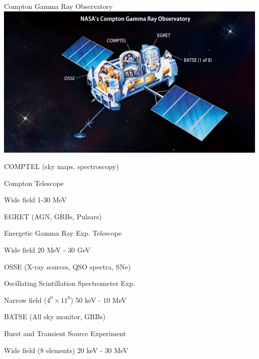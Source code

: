 \vspace*{1cm}
\begin{center}
{\blue Compton Gamma Ray Observatory}\\[5mm]
\includegraphics[keepaspectratio,width=13.5cm]{cgro2}
\end{center}

\newpage
\vspace*{2mm}
%
\begin{itemize}
\item COMPTEL (sky maps, spectroscopy)
\item[] Compton Telescope
\item[] Wide field 1-30 MeV
{\blue
\item EGRET (AGN, GRBs, Pulsars)
\item[] Energetic Gamma Ray Exp. Telescope
\item[] Wide field 20 MeV - 30 GeV
}
\item OSSE (X-ray sources, QSO spectra, SNe)
\item[] Oscillating Scintillation Spectrometer Exp.
\item[] Narrow field ($4^{0} \times 11^{0}$) 50 keV - 10 MeV
{\blue
\item BATSE (All sky monitor, GRBs)
\item[] Burst and Transient Source Experiment
\item[] Wide field (8 elements) 20 keV - 30 MeV
}
\end{itemize}


